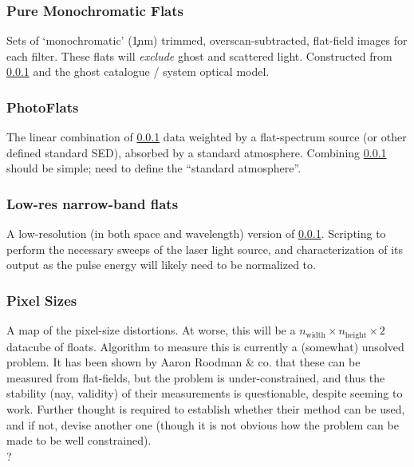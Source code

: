 \subsubsection{Pure Monochromatic Flats}\label{calibProducts:monoPhotoFlat}
Sets of `monochromatic' (\c 1nm) trimmed, overscan-subtracted, flat-field images for each filter. These flats will \textit{exclude} ghost and scattered light.
\alg Constructed from \secsymbol\ref{calibProducts:monoPhotoFlat} and the ghost catalogue / system optical model.


\subsubsection{PhotoFlats}\label{calibProducts:standardPhotoFlat}
The linear combination of \secsymbol\ref{calibProducts:monoPhotoFlat} data weighted by a flat-spectrum source (or other defined standard SED), absorbed by a standard atmosphere.
\alg Combining \secsymbol\ref{calibProducts:monoPhotoFlat} should be simple; need to define the ``standard atmosphere''.


\subsubsection{Low-res narrow-band flats}\label{calibProducts:monoPhotoFlatLowRes}
A low-resolution (in both space and wavelength) version of \secsymbol\ref{calibProducts:monoPhotoFlat}.
\alg Scripting to perform the necessary sweeps of the laser light source, and characterization of its output as the pulse energy will likely need to be normalized to. 


\subsubsection{Pixel Sizes }\label{calibProducts:pixelSizeMap}
A map of the pixel-size distortions. At worse, this will be a $n_{\mbox{width}}\times n_{\mbox{height}}\times 2$ datacube of floats.
\alg Algorithm to measure this is currently a (somewhat) unsolved problem. It has been shown by Aaron Roodman \& co. that these can be measured from flat-fields, but the problem is under-constrained, and thus the stability (nay, validity) of their measurements is questionable, despite seeming to work. Further thought is required to establish whether their method can be used, and if not, devise another one (though it is not obvious how the problem can be made to be well constrained). 
\\ \dragons ?

